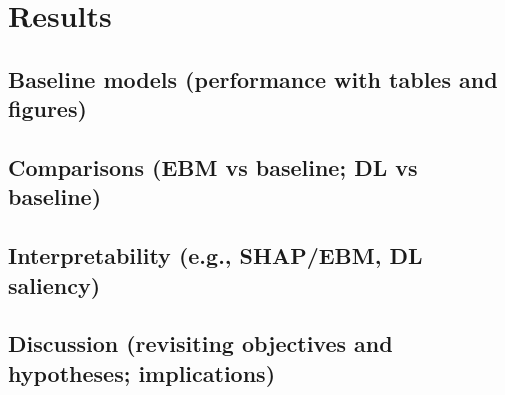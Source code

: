 \chapter{Results}\label{chap:results}

\section{Baseline models (performance with tables and figures)}\label{sec:results-baseline}

\section{Comparisons (EBM vs baseline; DL vs baseline)}\label{sec:results-comparisons}

\section{Interpretability (e.g., SHAP/EBM, DL saliency)}\label{sec:interpretability}

\section{Discussion (revisiting objectives and hypotheses; implications)}\label{sec:discussion}

